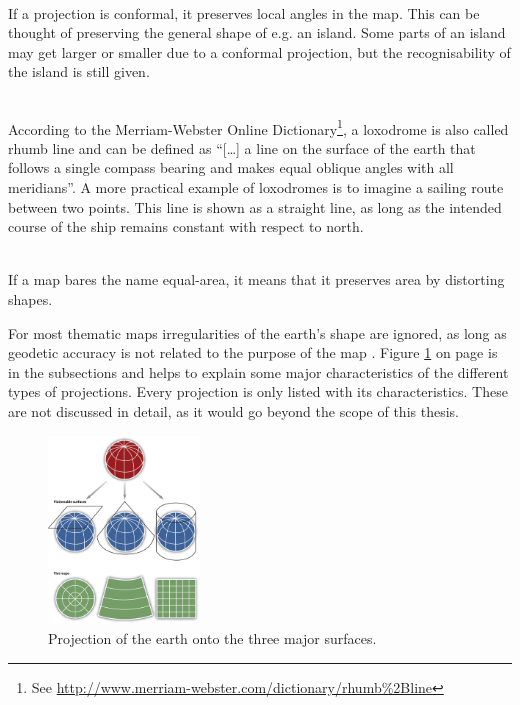\begin{enumerate}

 \hfill \\
If a projection is conformal, it preserves local angles in the map. This can be thought of preserving the general shape of e.g. an island. Some parts of an island may get larger or smaller due to a conformal projection, but the recognisability of the island is still given.

 \hfill \\
According to the Merriam-Webster Online Dictionary\footnote{See \href{http://www.merriam-webster.com/dictionary/rhumb\%2Bline}{http://www.merriam-webster.com/dictionary/rhumb\%2Bline}}, a loxodrome is also called rhumb line and can be defined as ``[\ldots] a line on the surface of the earth that follows a single compass bearing and makes equal oblique angles with all meridians''. A more practical example of loxodromes is to imagine a sailing route between two points. This line is shown as a straight line, as long as the intended course of the ship remains constant with respect to north.

 \hfill \\
If a map bares the name equal-area, it means that it preserves area by distorting shapes.

\end{enumerate}

For most thematic maps irregularities of the earth's shape are ignored, as long as geodetic accuracy is not related to the purpose of the map . Figure \ref{fig:projections-base} on page \pageref{fig:projections-base} is in the subsections and helps to explain some major characteristics of the different types of projections. Every projection is only listed with its characteristics. These are not discussed in detail, as it would go beyond the scope of this thesis.

\begin{figure}[!htb]
\centering
\includegraphics[height=5cm,keepaspectratio]{images/methods/projections/overview.jpg}
\caption[
    Projection of the earth onto the three major surfaces, Urldate: 08.2016 \newline
    \small\texttt{\url{http://images.flatworldknowledge.com/campbell/campbell-fig02_011.jpg}}.
]{Projection of the earth onto the three major surfaces.}
\label{fig:projections-base}
\end{figure}

